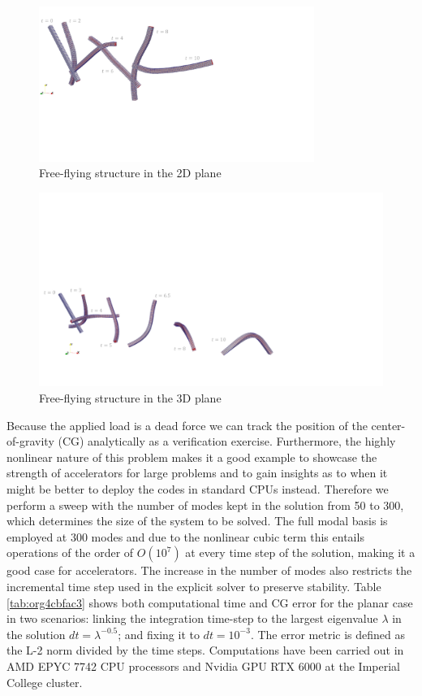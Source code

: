 \documentclass[11pt]{article}
\begin{document}
\begin{figure}[htbp]
\centering
\includegraphics[width=0.8\textwidth]{figs_ext/FFB_2D3.pdf}
\caption{\label{fig:org9faf760}Free-flying structure in the 2D plane}
\end{figure}


\begin{figure}[htbp]
\centering
\includegraphics[width=1.\textwidth]{figs_ext/FFB_3D3.pdf}
\caption{\label{fig:org6578e1b}Free-flying structure in the 3D plane}
\end{figure}


Because the applied load is a dead force we can track the position of the center-of-gravity (CG) analytically as a verification exercise. Furthermore, the highly nonlinear nature of this problem makes it a good example to showcase the strength of accelerators for large problems and to gain insights as to when it might be better to deploy the codes in standard CPUs instead. Therefore we perform a sweep with the number of modes kept in the solution from 50 to 300, which determines the size of the system to be solved. The full modal basis is employed at 300 modes and due to the nonlinear cubic term this entails operations of the order of \(O(10^7)\) at every time step of the solution, making it a good case for accelerators. The increase in the number of modes also restricts the incremental time step used in the explicit solver to preserve stability. Table \ref{tab:org4cbfac3} shows both computational time and CG error for the planar case in two scenarios: linking  the integration time-step to the largest eigenvalue \(\lambda\) in the solution \(dt=\lambda^{-0.5}\); and fixing it to \(dt=10^{-3}\).
The error metric is defined as the L-2 norm divided by the time steps.
Computations have been carried out in AMD EPYC 7742 CPU processors and Nvidia GPU RTX 6000 at the Imperial College cluster.
\end{document}
